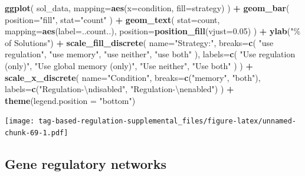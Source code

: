 \documentclass[
]{book}
\newenvironment{Shaded}{\begin{snugshade}}{\end{snugshade}}
\newcommand{\CharTok}[1]{\textcolor[rgb]{0.31,0.60,0.02}{#1}}
\newcommand{\DataTypeTok}[1]{\textcolor[rgb]{0.13,0.29,0.53}{#1}}
\newcommand{\FloatTok}[1]{\textcolor[rgb]{0.00,0.00,0.81}{#1}}
\newcommand{\KeywordTok}[1]{\textcolor[rgb]{0.13,0.29,0.53}{\textbf{#1}}}
\newcommand{\NormalTok}[1]{#1}
\newcommand{\OperatorTok}[1]{\textcolor[rgb]{0.81,0.36,0.00}{\textbf{#1}}}
\newcommand{\StringTok}[1]{\textcolor[rgb]{0.31,0.60,0.02}{#1}}
\begin{document}
\begin{Shaded}
\begin{Highlighting}[]
\KeywordTok{ggplot}\NormalTok{( sol\_data, }\DataTypeTok{mapping=}\KeywordTok{aes}\NormalTok{(}\DataTypeTok{x=}\NormalTok{condition, }\DataTypeTok{fill=}\NormalTok{strategy) ) }\OperatorTok{+}
\StringTok{  }\KeywordTok{geom\_bar}\NormalTok{(}
    \DataTypeTok{position=}\StringTok{"fill"}\NormalTok{,}
    \DataTypeTok{stat=}\StringTok{"count"}
\NormalTok{  ) }\OperatorTok{+}
\StringTok{  }\KeywordTok{geom\_text}\NormalTok{(}
    \DataTypeTok{stat=}\StringTok{\textquotesingle{}count\textquotesingle{}}\NormalTok{,}
    \DataTypeTok{mapping=}\KeywordTok{aes}\NormalTok{(}\DataTypeTok{label=}\NormalTok{..count..),}
    \DataTypeTok{position=}\KeywordTok{position\_fill}\NormalTok{(}\DataTypeTok{vjust=}\FloatTok{0.05}\NormalTok{)}
\NormalTok{  ) }\OperatorTok{+}
\StringTok{  }\KeywordTok{ylab}\NormalTok{(}\StringTok{"\% of Solutions"}\NormalTok{) }\OperatorTok{+}
\StringTok{  }\KeywordTok{scale\_fill\_discrete}\NormalTok{(}
    \DataTypeTok{name=}\StringTok{"Strategy:"}\NormalTok{,}
    \DataTypeTok{breaks=}\KeywordTok{c}\NormalTok{(}
      \StringTok{"use regulation"}\NormalTok{,}
      \StringTok{"use memory"}\NormalTok{,}
      \StringTok{"use neither"}\NormalTok{,}
      \StringTok{"use both"}
\NormalTok{    ),}
    \DataTypeTok{labels=}\KeywordTok{c}\NormalTok{(}
      \StringTok{"Use regulation (only)"}\NormalTok{,}
      \StringTok{"Use global memory (only)"}\NormalTok{,}
      \StringTok{"Use neither"}\NormalTok{,}
      \StringTok{"Use both"}
\NormalTok{    )}
\NormalTok{  ) }\OperatorTok{+}
\StringTok{  }\KeywordTok{scale\_x\_discrete}\NormalTok{(}
    \DataTypeTok{name=}\StringTok{"Condition"}\NormalTok{,}
    \DataTypeTok{breaks=}\KeywordTok{c}\NormalTok{(}\StringTok{"memory"}\NormalTok{, }\StringTok{"both"}\NormalTok{),}
    \DataTypeTok{labels=}\KeywordTok{c}\NormalTok{(}\StringTok{"Regulation{-}}\CharTok{\textbackslash{}n}\StringTok{disabled"}\NormalTok{, }\StringTok{"Regulation{-}}\CharTok{\textbackslash{}n}\StringTok{enabled"}\NormalTok{)}
\NormalTok{  ) }\OperatorTok{+}
\StringTok{  }\KeywordTok{theme}\NormalTok{(}\DataTypeTok{legend.position =} \StringTok{"bottom"}\NormalTok{)}
\end{Highlighting}
\end{Shaded}

\texttt{[image: tag-based-regulation-supplemental\_files/figure-latex/unnamed-chunk-69-1.pdf]}

\hypertarget{gene-regulatory-networks-1}{%
\subsection{Gene regulatory networks}\label{gene-regulatory-networks-1}}
\end{document}
